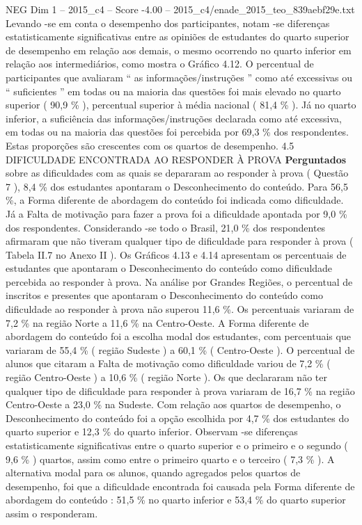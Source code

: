 \begin{textsample}{NEG Dim 1 – 2015\_c4 – Score -4.00 – 2015\_c4/enade\_2015\_teo\_839aebf29e.txt}
Levando -se em conta o desempenho dos participantes, notam -se diferenças estatisticamente significativas entre as opiniões de estudantes do quarto superior de desempenho em relação aos demais, o mesmo ocorrendo no quarto inferior em relação aos intermediários, como mostra o Gráfico 4.12.
O percentual de participantes que avaliaram “ as informações/instruções ” como até excessivas ou “ suficientes ” em todas ou na maioria das questões foi mais elevado no quarto superior ( 90,9 \% ), percentual superior à média nacional ( 81,4 \% ).
Já no quarto inferior, a suficiência das informações/instruções declarada como até excessiva, em todas ou na maioria das questões foi percebida por 69,3 \% dos respondentes.
Estas proporções são crescentes com os quartos de desempenho. 4.5 DIFICULDADE ENCONTRADA AO RESPONDER À PROVA \textbf{Perguntados} sobre as dificuldades com as quais se depararam ao responder à prova ( Questão 7 ), 8,4 \% dos estudantes apontaram o Desconhecimento do conteúdo.
Para 56,5 \%, a Forma diferente de abordagem do conteúdo foi indicada como dificuldade.
Já a Falta de motivação para fazer a prova foi a dificuldade apontada por 9,0 \% dos respondentes.
Considerando -se todo o Brasil, 21,0 \% dos respondentes afirmaram que não tiveram qualquer tipo de dificuldade para responder à prova ( Tabela II.7 no Anexo II ).
Os Gráficos 4.13 e 4.14 apresentam os percentuais de estudantes que apontaram o Desconhecimento do conteúdo como dificuldade percebida ao responder à prova.
Na análise por Grandes Regiões, o percentual de inscritos e presentes que apontaram o Desconhecimento do conteúdo como dificuldade ao responder à prova não superou 11,6 \%.
Os percentuais variaram de 7,2 \% na região Norte a 11,6 \% na Centro-Oeste.
A Forma diferente de abordagem do conteúdo foi a escolha modal dos estudantes, com percentuais que variaram de 55,4 \% ( região Sudeste ) a 60,1 \% ( Centro-Oeste ).
O percentual de alunos que citaram a Falta de motivação como dificuldade variou de 7,2 \% ( região Centro-Oeste ) a 10,6 \% ( região Norte ).
Os que declararam não ter qualquer tipo de dificuldade para responder à prova variaram de 16,7 \% na região Centro-Oeste a 23,0 \% na Sudeste.
Com relação aos quartos de desempenho, o Desconhecimento do conteúdo foi a opção escolhida por 4,7 \% dos estudantes do quarto superior e 12,3 \% do quarto inferior.
Observam -se diferenças estatisticamente significativas entre o quarto superior e o primeiro e o segundo ( 9,6 \% ) quartos, assim como entre o primeiro quarto e o terceiro ( 7,3 \% ).
A alternativa modal para os alunos, quando agregados pelos quartos de desempenho, foi que a dificuldade encontrada foi causada pela Forma diferente de abordagem do conteúdo : 51,5 \% no quarto inferior e 53,4 \% do quarto superior assim o responderam.

\end{textsample}
